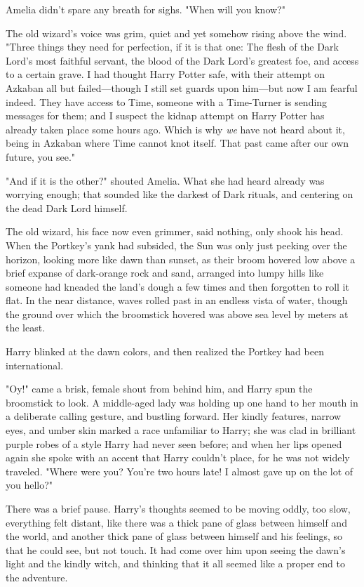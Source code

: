 Amelia didn't spare any breath for sighs. "When will you know?"

The old wizard's voice was grim, quiet and yet somehow rising above the wind.
"Three things they need for perfection, if it is that one: The flesh of the
Dark Lord's most faithful servant, the blood of the Dark Lord's greatest foe,
and access to a certain grave. I had thought Harry Potter safe, with their
attempt on Azkaban all but failed---though I still set guards upon him---but
now I am fearful indeed. They have access to Time, someone with a Time-Turner
is sending messages for them; and I suspect the kidnap attempt on Harry Potter
has already taken place some hours ago. Which is why \emph{we} have not heard
about it, being in Azkaban where Time cannot knot itself. That past came after
our own future, you see."

"And if it is the other?" shouted Amelia. What she had heard already was
worrying enough; that sounded like the darkest of Dark rituals, and centering
on the dead Dark Lord himself.

The old wizard, his face now even grimmer, said nothing, only shook his head.
\sbreak
When the Portkey's yank had subsided, the Sun was only just peeking over the
horizon, looking more like dawn than sunset, as their broom hovered low above a
brief expanse of dark-orange rock and sand, arranged into lumpy hills like
someone had kneaded the land's dough a few times and then forgotten to roll it
flat. In the near distance, waves rolled past in an endless vista of water,
though the ground over which the broomstick hovered was above sea level by
meters at the least.

Harry blinked at the dawn colors, and then realized the Portkey had been
international.

"Oy!" came a brisk, female shout from behind him, and Harry spun the broomstick
to look. A middle-aged lady was holding up one hand to her mouth in a
deliberate calling gesture, and bustling forward. Her kindly features, narrow
eyes, and umber skin marked a race unfamiliar to Harry; she was clad in
brilliant purple robes of a style Harry had never seen before; and when her
lips opened again she spoke with an accent that Harry couldn't place, for he
was not widely traveled. "Where were you? You're two hours late! I almost gave
up on the lot of you{\el} hello?"

There was a brief pause. Harry's thoughts seemed to be moving oddly, too slow,
everything felt distant, like there was a thick pane of glass between himself
and the world, and another thick pane of glass between himself and his
feelings, so that he could see, but not touch. It had come over him upon seeing
the dawn's light and the kindly witch, and thinking that it all seemed like a
proper end to the adventure.

